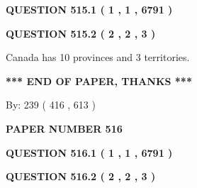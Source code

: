 \documentclass[12pt]{article}
\begin{document}
{\textbf{\Large{QUESTION
515.1 
 ( 1 , 1 , 6791 )
}}}
  
  
  
\vspace{0.2in}
  
{\textbf{\Large{QUESTION
515.2 
 ( 2 , 2 , 3 )
}}}
  
  
 
 
\noindent{}
 
 
Canada has 10  provinces and 3 territories.
 
 
 
 
   
   
 \vspace{0.2in}
 
   
   
   
   
\vspace{1.0in} 
{\textbf{\large{ *** END OF PAPER, THANKS *** }}} 
   
   
\hspace{1.0in} By: 
 239 ( 416 ,  613 )
   
   
   
   
\newpage 
\setcounter{page}{ 
   516001 } 
   
   
   
   
 {\textbf{ \Large{ PAPER NUMBER  516  }}}
   
   
\vspace{0.2in}
   
   
   
   
   
   
 \vspace{0.2in}
 
 
 
 
   
   
  
\vspace{0.2in}
  
{\textbf{\Large{QUESTION
516.1 
 ( 1 , 1 , 6791 )
}}}
  
  
  
\vspace{0.2in}
  
{\textbf{\Large{QUESTION
516.2 
 ( 2 , 2 , 3 )
}}}
  
  
 
 
\noindent{}
 
\end{document}
